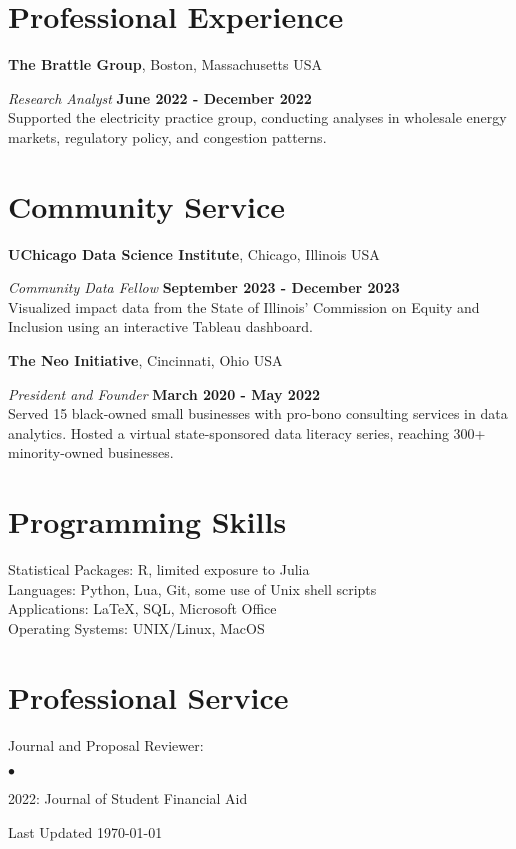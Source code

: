 \documentclass[margin,line]{res}
\newenvironment{list2}{
  \begin{list}{$\bullet$}{%
      \setlength{\itemsep}{0in}
      \setlength{\parsep}{0in} \setlength{\parskip}{0in}
      \setlength{\topsep}{0in} \setlength{\partopsep}{0in} 
      \setlength{\leftmargin}{0.2in}}}{\end{list}}
\begin{document}
\begin{resume}
\section{\sc Professional Experience}
{\bf The Brattle Group}, Boston, Massachusetts USA

\vspace{-.3cm}
{\em Research Analyst} \hfill {\bf June 2022 - December 2022}\\
Supported the electricity practice group, conducting analyses in wholesale energy markets, regulatory policy, and congestion patterns. 


\section{\sc Community Service}
{\bf UChicago Data Science Institute}, Chicago, Illinois USA

\vspace{-.3cm}
{\em Community Data Fellow} \hfill {\bf September 2023 - December 2023}\\
Visualized impact data from the State of Illinois' Commission on Equity and Inclusion using an interactive Tableau dashboard. 

{\bf The Neo Initiative}, Cincinnati, Ohio USA

\vspace{-.3cm}
{\em President and Founder} \hfill {\bf March 2020 -  May 2022}\\
Served 15 black-owned small businesses with pro-bono consulting services in data analytics. Hosted a virtual state-sponsored data literacy series, reaching 300+ minority-owned businesses. 

\section{\sc Programming Skills} 
Statistical Packages:  R, limited exposure to Julia \\ 
Languages:  Python, Lua, Git, some use of Unix shell scripts \\ 
Applications: \LaTeX, SQL, Microsoft Office \\
Operating Systems:  UNIX/Linux, MacOS 

\section{\sc Professional Service} 
Journal and Proposal Reviewer:
\begin{list2}
\item 2022: Journal of Student Financial Aid
\end{list2}

\end{resume}

\begin{center}
  \vfill
  Last Updated \today
\end{center}
\end{document}
